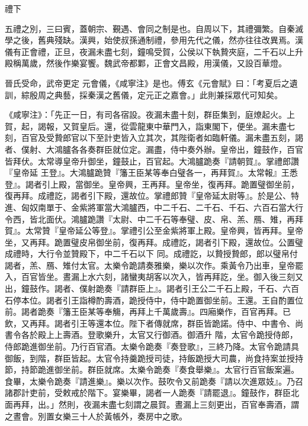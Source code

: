 
\begin{pinyinscope}

 禮下



 五禮之別，三曰賓，蓋朝宗、覲遇、會同之制是也。自周以下，其禮彌繁。自秦滅學之後，舊典殘缺。漢興，始使叔孫通制禮，參用先代之儀，然亦往往改異焉。漢儀有正會禮，正旦，夜漏未盡七刻，鐘鳴受賀，公侯以下執贄夾庭，二千石以上升殿稱萬歲，然後作樂宴饗。魏武帝都鄴，正會文昌殿，用漢儀，又設百華燈。



 晉氏受命，武帝更定
 元會儀，《咸寧注》是也。傅玄《元會賦》曰：「考夏后之遺訓，綜殷周之典藝，採秦漢之舊儀，定元正之嘉會。」此則兼採眾代可知矣。



 《咸寧注》：「先正一日，有司各宿設。夜漏未盡十刻，群臣集到，庭燎起火。上賀，起，謁報，又賀皇后。還，從雲龍東中華門入，詣東閣下，便坐。漏未盡七刻，百官及受贄郎官以下至計吏皆入立其次，其陛衛者如臨軒儀。漏未盡五刻，謁者、僕射、大鴻臚各各奏群臣就位定。漏盡，侍中奏外辦。皇帝出，鐘鼓作，百官皆拜伏。太常導皇帝升御坐，鐘鼓止，百官起。大鴻臚跪奏『請朝賀』。掌禮郎讚『皇帝延
 王登』。大鴻臚跪贊『籓王臣某等奉白璧各一，再拜賀』。太常報』王悉登』。謁者引上殿，當御坐。皇帝興，王再拜。皇帝坐，復再拜。跪置璧御坐前，復再拜。成禮訖，謁者引下殿，還故位。掌禮郎贊『皇帝延太尉等』。於是公、特進、匈奴南單于、金紫將軍當大鴻臚西，中二千石、二千石、千石、六百石當大行令西，皆北面伏。鴻臚跪讚『太尉、中二千石等奉璧、皮、帛、羔、鴈、雉，再拜賀』。太常贊『皇帝延公等登』。掌禮引公至金紫將軍上殿。皇帝興，皆再拜。皇帝坐，又再拜。跪置璧皮帛御坐前，復再拜。成禮訖，謁者引下殿，還故位。公置璧成禮時，大行令並贊殿下，中二千石以下
 同。成禮訖，以贄授贄郎，郎以璧帛付謁者，羔、鴈、雉付太官。太樂令跪請奏雅樂，樂以次作。乘黃令乃出車，皇帝罷入，百官皆坐。晝漏上水六刻，諸蠻夷胡客以次入，皆再拜訖，坐。御入後三刻又出，鐘鼓作。謁者、僕射跪奏『請群臣上』。謁者引王公二千石上殿，千石、六百石停本位。謁者引王詣樽酌壽酒，跪授侍中，侍中跪置御坐前。王還。王自酌置位前。謁者跪奏『籓王臣某等奉觴，再拜上千萬歲壽』。四廂樂作，百官再拜。已飲，又再拜。謁者引王等還本位。陛下者傳就席，群臣皆跪諾。侍中、中書令、尚書令各於殿上上壽酒。登歌樂升，太官又行御酒。御酒升
 階，太官令跪授侍郎，侍郎跪進御坐前。乃行百官酒。太樂令跪奏『奏登歌』，三終乃降。太官令跪請具御飯，到階，群臣皆起。太官令持羹跪授司徒，持飯跪授大司農，尚食持案並授持節，持節跪進御坐前。群臣就席。太樂令跪奏『奏食舉樂』。太官行百官飯案遍。食畢，太樂令跪奏『請進樂』。樂以次作。鼓吹令又前跪奏『請以次進眾妓』。乃召諸郡計吏前，受敕戒於階下。宴樂畢，謁者一人跪奏『請罷退』。鐘鼓作，群臣北面再拜，出。」然則，夜漏未盡七刻謂之晨賀。晝漏上三刻更出，百官奉壽酒，謂之晝會。別置女樂三十人於黃帳外，奏房中之歌。




\end{pinyinscope}
